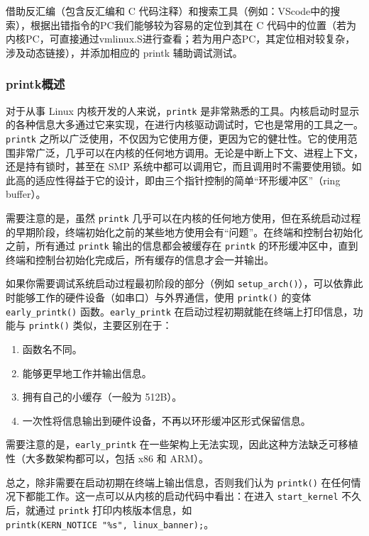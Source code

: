 借助反汇编（包含反汇编和 C 代码注释）和搜索工具（例如：VScode中的搜索），根据出错指令的PC我们能够较为容易的定位到其在 C 代码中的位置（若为内核PC，可直接通过vmlinux.S进行查看；若为用户态PC，其定位相对较复杂，涉及动态链接），并添加相应的 printk 辅助调试测试。

\subsubsection{printk概述}\label{sec:02-software-preparation-021}

对于从事 Linux 内核开发的人来说，\texttt{printk} 是非常熟悉的工具。内核启动时显示的各种信息大多通过它来实现，在进行内核驱动调试时，它也是常用的工具之一。\texttt{printk} 之所以广泛使用，不仅因为它使用方便，更因为它的健壮性。它的使用范围非常广泛，几乎可以在内核的任何地方调用。无论是中断上下文、进程上下文，还是持有锁时，甚至在 SMP 系统中都可以调用它，而且调用时不需要使用锁。如此高的适应性得益于它的设计，即由三个指针控制的简单``环形缓冲区''（ring buffer）。

需要注意的是，虽然 \texttt{printk} 几乎可以在内核的任何地方使用，但在系统启动过程的早期阶段，终端初始化之前的某些地方使用会有``问题''。在终端和控制台初始化之前，所有通过 \texttt{printk} 输出的信息都会被缓存在 \texttt{printk} 的环形缓冲区中，直到终端和控制台初始化完成后，所有缓存的信息才会一并输出。

如果你需要调试系统启动过程最初阶段的部分（例如 \texttt{setup\_arch()}），可以依靠此时能够工作的硬件设备（如串口）与外界通信，使用 \texttt{printk()} 的变体 \texttt{early\_printk()} 函数。\texttt{early\_printk} 在启动过程初期就能在终端上打印信息，功能与 \texttt{printk()} 类似，主要区别在于：

\begin{enumerate}
\def\labelenumi{\arabic{enumi}.}
\tightlist
\item
  函数名不同。
\item
  能够更早地工作并输出信息。
\item
  拥有自己的小缓存（一般为 512B）。
\item
  一次性将信息输出到硬件设备，不再以环形缓冲区形式保留信息。
\end{enumerate}

需要注意的是，\texttt{early\_printk} 在一些架构上无法实现，因此这种方法缺乏可移植性（大多数架构都可以，包括 x86 和 ARM）。

总之，除非需要在启动初期在终端上输出信息，否则我们认为 \texttt{printk()} 在任何情况下都能工作。这一点可以从内核的启动代码中看出：在进入 \texttt{start\_kernel} 不久后，就通过 \texttt{printk} 打印内核版本信息，如 \texttt{printk(KERN\_NOTICE\ "\%s",\ linux\_banner);}。

